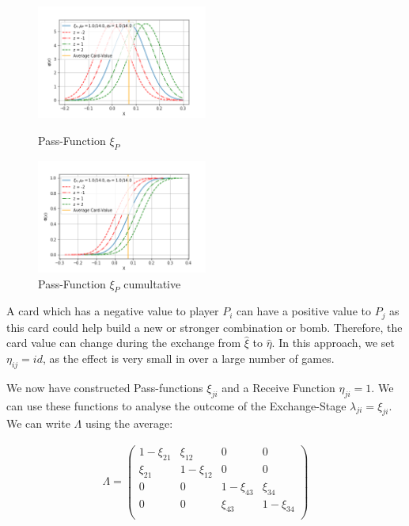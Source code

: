\begin{figure}[h]
    \centering
    \includegraphics[width=0.5\textwidth]{Bilder/b1_c}
    \caption{Pass-Function $\xi_P$}
    \label{fig:6}
    \centering
    \includegraphics[width=0.5\textwidth]{Bilder/b1_d}
    \caption{Pass-Function $\xi_P$ cumultative}
    \label{fig:7}
\end{figure}

A card which has a negative value to player $P_i$ can have a positive value to $P_j$ as this card could help build a new or stronger combination or bomb. Therefore, the card value can change during the exchange from $\hat{\xi}$ to $\hat{\eta}$. In this approach, we set $\eta_{ij} = id$, as the effect is very small in over a large number of games. 

We now have constructed Pass-functions $\xi_{ji}$ and a Receive Function $\eta_{ji} = 1$. We can use these functions to analyse the outcome of the Exchange-Stage $\lambda_{ji} = \xi_{ji}$. We can write $\Lambda$ using the average:

\begin{gather*}
\Lambda = \begin{pmatrix} 
1 - \xi_{21} & \xi_{12} & 0 & 0 \\
\xi_{21} & 1 - \xi_{12} & 0 & 0 \\
0 & 0 & 1 -  \xi_{43} & \xi_{34} \\
0 & 0 &  \xi_{43} & 1 - \xi_{34} \\
\end{pmatrix}
\end{gather*}

